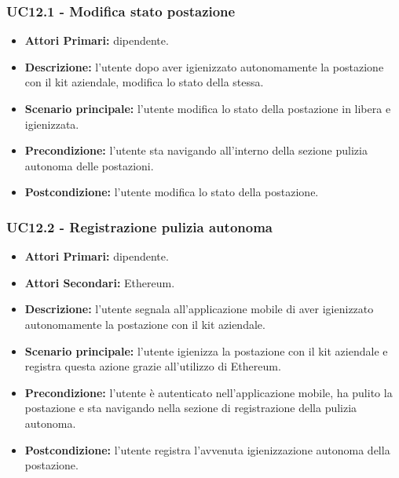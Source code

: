 \subsubsection{ UC12.1 - Modifica stato postazione }
\begin{itemize}
	\item\textbf{Attori Primari:} dipendente.
	\item\textbf{Descrizione:} l’utente dopo aver igienizzato autonomamente la postazione con il kit aziendale, modifica lo stato della stessa.
	\item\textbf{Scenario principale:} l’utente modifica lo stato della postazione in libera e igienizzata.
	\item\textbf{Precondizione:} l’utente sta navigando all'interno della sezione pulizia autonoma delle postazioni.
	\item\textbf{Postcondizione:} l’utente modifica lo stato della postazione.
\end{itemize}

\subsubsection{ UC12.2 - Registrazione pulizia autonoma }
\begin{itemize}
	\item\textbf{Attori Primari:} dipendente.
	\item\textbf{Attori Secondari:} Ethereum.
	\item\textbf{Descrizione:} l’utente segnala all'applicazione mobile di aver igienizzato autonomamente la postazione con il kit aziendale.
	\item\textbf{Scenario principale:} l’utente igienizza la postazione con il kit aziendale e registra questa azione grazie all'utilizzo di Ethereum.
	\item\textbf{Precondizione:} l’utente è autenticato nell'applicazione mobile, ha pulito la postazione e sta navigando nella sezione di 
	registrazione della pulizia autonoma.
	\item\textbf{Postcondizione:} l’utente registra l'avvenuta igienizzazione autonoma della postazione.
\end{itemize}
